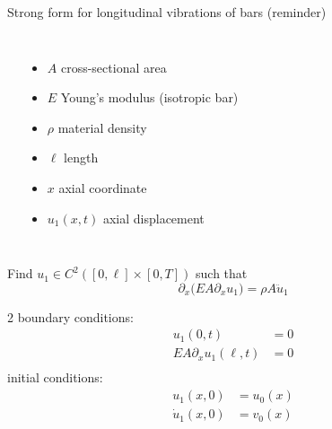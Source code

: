 \documentclass[aspectratio=169]{beamer}
\begin{document}
\begin{frame}{Strong form for longitudinal vibrations of bars (reminder)}
  \begin{columns}
    \begin{center}
    \end{center}
    {\tiny \begin{itemize}
        \item $A$ cross-sectional area
        \item $E$ Young's modulus (isotropic bar)
        \item $\rho$ material density
        \item $\ell$ length
        \item $x$ axial coordinate
        \item $u_1(x,t)$ axial displacement
      \end{itemize}}
  \end{columns}
  \vspace{0.3cm}
  \begin{block}{}
    Find $u_{1}\in C^2([0,\ell]\times[0,T])$ such that
    \[
      \partial_{x}\big(EA \partial_{x}u_{1}\big) = \rho A \ddot{u}_1
    \]
    \begin{multicols}{2}
      boundary conditions:
      \[
        \begin{aligned}
          u_1(0, t)                    & = 0 \\
          EA \partial_{x} u_1(\ell, t) & = 0 \\
        \end{aligned}
      \]
      initial conditions:
      \[
        \begin{aligned}
          u_1(x, 0)       & = u_0(x) \\
          \dot{u}_1(x, 0) & = v_0(x)
        \end{aligned}
      \]
    \end{multicols}
    \vspace{0.01cm}
  \end{block}
\end{frame}
\end{document}
